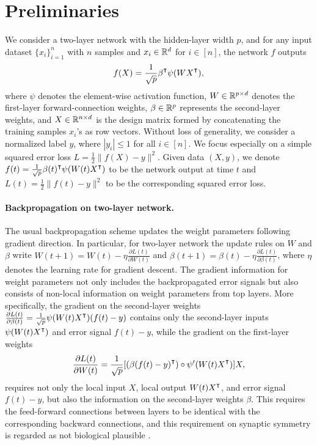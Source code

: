 \section{Preliminaries}

We consider a two-layer network with the hidden-layer width $p$, and for any input dataset $\{x_i\}_{i=1}^n$ with $n$ samples and $x_i\in{\mathbb{R}^{d}}$ for $i\in[n]$, the network $f$ outputs 
\begin{align}\label{eqn:nonlinear-network}
    f(X) = \frac{1}{\sqrt p}\beta\transpose\psi(WX\transpose),
\end{align}
where $\psi$ denotes the element-wise activation function, $W\in{\mathbb{R}^{p\times d}}$ denotes the first-layer forward-connection weights, $\beta\in{\mathbb{R}^{p}}$ represents the second-layer weights, and $X\in{\mathbb{R}^{n\times d}}$ is the design matrix formed by concatenating the training samples $x_i$'s as row vectors. 
Without loss of generality, we consider a normalized label $y$, where $|y_i|\leq 1$ for all $i\in[n]$.
We focus especially on a simple squared error loss $L = \frac{1}{2}\|f(X)-y\|^2$. Given data $(X,y)$, we denote $f(t) = \frac{1}{\sqrt p}\beta(t)\transpose\psi(W(t)X\transpose)$ to be the network output at time $t$ and $L(t) = \frac{1}{2}\|f(t)-y\|^2$ to be the corresponding squared error loss.

\paragraph{Backpropagation on two-layer network.}

The usual backpropagation scheme updates the weight parameters following gradient direction. In particular, for two-layer network the update rules on $W$ and $\beta$ write $W(t+1) = W(t) - \eta \frac{\partial L(t)}{\partial W(t)}$ and $\beta(t+1) = \beta(t) - \eta \frac{\partial L(t)}{\partial \beta(t)}$, where $\eta$ denotes the learning rate for gradient descent. The gradient information for weight parameters not only includes the backpropagated error signals but also consists of non-local information on weight parameters from top layers. More specifically, the gradient on the second-layer weights $\frac{\partial L(t)}{\partial \beta(t)} = \frac{1}{\sqrt{p}} \psi(W(t) X\transpose) (f(t) - y)$ contains only the second-layer inputs $\psi(W(t) X\transpose)$ and error signal $f(t) - y$, while the gradient on the first-layer weights 
\begin{align}\label{eqn:backprop-gradient}
    \frac{\partial L(t)}{\partial W(t)} = \frac{1}{\sqrt{p}} [(\beta (f(t) - y)\transpose)\circ \psi'(W(t)X\transpose)] X,
\end{align}
requires not only the local input $X$, local output $W(t)X\transpose$, and error signal $f(t) - y$, but also the information on the second-layer weights $\beta$.
This requires the feed-forward connections between layers to be identical with the corresponding backward connections, and this requirement on synaptic symmetry is regarded as not biological plausible \citep{lillicrap2016random}. 


